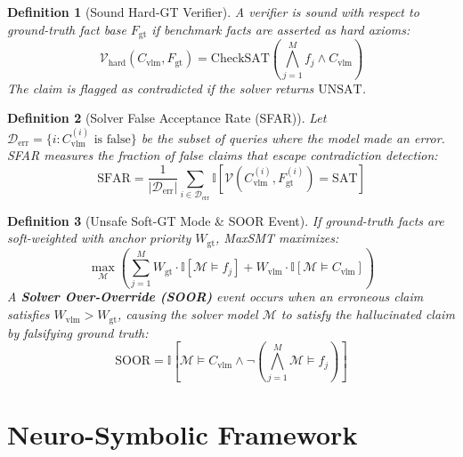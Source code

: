 \documentclass[10pt,twocolumn,letterpaper]{article}
\newtheorem{definition}{Definition}
\begin{document}
\begin{definition}[Sound Hard-GT Verifier]
A verifier is sound with respect to ground-truth fact base $F_{\text{gt}}$ if benchmark facts are asserted as hard axioms:
\begin{equation}
\mathcal{V}_{\text{hard}}(C_{\text{vlm}}, F_{\text{gt}}) = \text{CheckSAT}\left( \bigwedge_{j=1}^M f_j \wedge C_{\text{vlm}} \right)
\end{equation}
The claim is flagged as contradicted if the solver returns $\text{UNSAT}$.
\end{definition}

\begin{definition}[Solver False Acceptance Rate (SFAR)]
Let $\mathcal{D}_{\text{err}} = \{i : C_{\text{vlm}}^{(i)} \text{ is false}\}$ be the subset of queries where the model made an error. SFAR measures the fraction of false claims that escape contradiction detection:
\begin{equation}
\text{SFAR} = \frac{1}{|\mathcal{D}_{\text{err}}|} \sum_{i \in \mathcal{D}_{\text{err}}} \mathbb{I}\left[ \mathcal{V}(C_{\text{vlm}}^{(i)}, F_{\text{gt}}^{(i)}) = \text{SAT} \right]
\end{equation}
\end{definition}

\begin{definition}[Unsafe Soft-GT Mode \& SOOR Event]
If ground-truth facts are soft-weighted with anchor priority $W_{\text{gt}}$, MaxSMT maximizes:
\begin{equation}
\max_{\mathcal{M}} \left( \sum_{j=1}^M W_{\text{gt}} \cdot \mathbb{I}[\mathcal{M} \models f_j] + W_{\text{vlm}} \cdot \mathbb{I}[\mathcal{M} \models C_{\text{vlm}}] \right)
\end{equation}
A \textbf{Solver Over-Override (SOOR)} event occurs when an erroneous claim satisfies $W_{\text{vlm}} > W_{\text{gt}}$, causing the solver model $\mathcal{M}$ to satisfy the hallucinated claim by falsifying ground truth:
\begin{equation}
\text{SOOR} = \mathbb{I}\left[ \mathcal{M} \models C_{\text{vlm}} \wedge \neg \left( \bigwedge_{j=1}^M \mathcal{M} \models f_j \right) \right]
\end{equation}
\end{definition}

\section{Neuro-Symbolic Framework}
\end{document}

